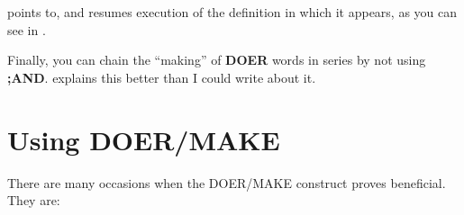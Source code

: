 
points to, and resumes execution of the definition in which it appears, as
you can see in .

Finally, you can chain the ``making'' of \textbf{DOER} words in series by
not using \textbf{;AND}.  explains this better than I could write about
it.

\section{Using DOER/MAKE}

There are many occasions when the DOER/MAKE construct proves
beneficial. They are:

